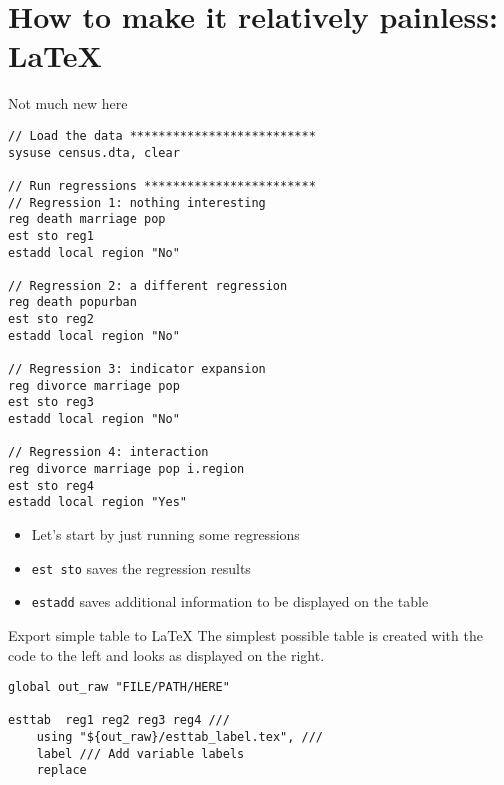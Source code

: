 \documentclass[aspectratio=169]{beamer}
\begin{document}
\section{How to make it relatively painless: LaTeX}
\begin{frame}[fragile]{Not much new here}
\begin{multicols}{2}
\begin{lstlisting}
// Load the data **************************
sysuse census.dta, clear

// Run regressions ************************
// Regression 1: nothing interesting
reg death marriage pop
est sto reg1
estadd local region "No"

// Regression 2: a different regression
reg death popurban
est sto reg2
estadd local region "No"

// Regression 3: indicator expansion
reg divorce marriage pop
est sto reg3
estadd local region "No"

// Regression 4: interaction
reg divorce marriage pop i.region
est sto reg4
estadd local region "Yes"
\end{lstlisting}

\vspace{2cm}
\vspace{2cm}
\begin{itemize}
    \item Let's start by just running some regressions
    \item \texttt{est sto} saves the regression results
    \item \texttt{estadd} saves additional information to be displayed on the table
\end{itemize}

\end{multicols}
\end{frame}


\begin{frame}[fragile]{Export simple table to \LaTeX }
The simplest possible table is created with the code to the left and looks as displayed on the right.

\begin{multicols}{2}
\begin{lstlisting}
global out_raw "FILE/PATH/HERE"

esttab  reg1 reg2 reg3 reg4 ///
    using "${out_raw}/esttab_label.tex", ///
    label /// Add variable labels
    replace
\end{lstlisting}

\begin{table}
\begin{adjustbox}{max width = .45\textwidth}

\end{adjustbox}
\end{table}
\end{multicols}
\end{frame}
\end{document}
